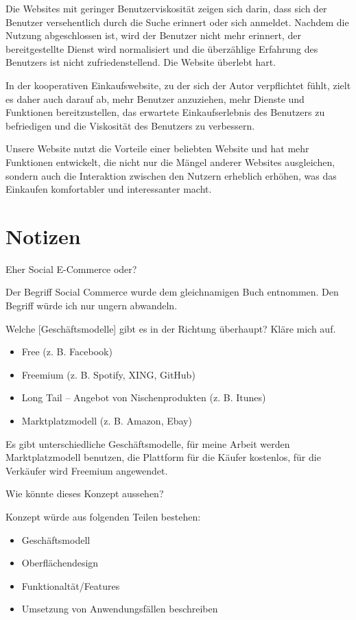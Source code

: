 Die Websites mit geringer Benutzerviskosität zeigen sich darin, dass sich der Benutzer versehentlich durch die Suche erinnert oder sich anmeldet. Nachdem die Nutzung abgeschlossen ist, wird der Benutzer nicht mehr erinnert, der bereitgestellte Dienst wird normalisiert und die \glqq{}überzählige\grqq{} Erfahrung des Benutzers ist nicht zufriedenstellend. Die Website überlebt hart.\\
\parencite{localytics}

In der kooperativen Einkaufswebsite, zu der sich der Autor verpflichtet fühlt, zielt es daher auch darauf ab, mehr Benutzer anzuziehen, mehr Dienste und Funktionen bereitzustellen, das erwartete Einkaufserlebnis des Benutzers zu befriedigen und die Viskosität des Benutzers zu verbessern.

Unsere Website nutzt die Vorteile einer beliebten Website und hat mehr Funktionen entwickelt, die nicht nur die Mängel anderer Websites ausgleichen, sondern auch die Interaktion zwischen den Nutzern erheblich erhöhen, was das Einkaufen komfortabler und interessanter macht.


\section{Notizen}

Eher Social E-Commerce oder?

Der Begriff Social Commerce wurde dem gleichnamigen Buch \parencite{turban:sc} entnommen. Den Begriff würde ich nur ungern abwandeln. 

Welche [Geschäftsmodelle] gibt es in der Richtung überhaupt? Kläre mich auf. 

\begin{itemize}
\item Free (z. B. Facebook)
\item Freemium (z. B. Spotify, XING, GitHub)
\item Long Tail – Angebot von Nischenprodukten (z. B. Itunes)
\item Marktplatzmodell (z. B. Amazon, Ebay)
\end{itemize}

Es gibt unterschiedliche Geschäftsmodelle, für meine Arbeit werden Marktplatzmodell benutzen, die Plattform für die Käufer kostenlos, für die Verkäufer wird Freemium angewendet.

Wie könnte dieses Konzept aussehen? 

Konzept würde aus folgenden Teilen bestehen: 
\begin{itemize}
\item Geschäftsmodell 
\item Oberflächendesign 
\item Funktionaltät/Features 
\item Umsetzung von Anwendungsfällen beschreiben 
\end{itemize}

